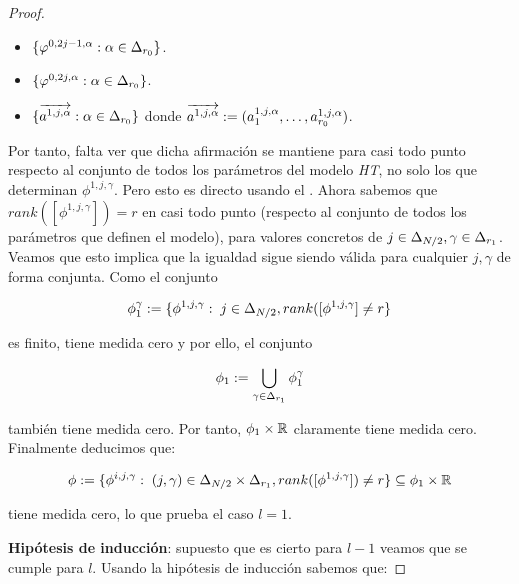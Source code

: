 \begin{proof}
    \begin{itemize}
        \item $\{ \varphi^{0, 2j - 1, \alpha}: \alpha \in \Delta_{r_0} \}$.
        \item $\{ \varphi^{0, 2j, \alpha}: \alpha \in \Delta_{r_0} \}$.
        \item $\{ \overrightarrow{a^{1, j, \alpha}} : \alpha \in \Delta_{r_0} \}$ donde $\overrightarrow{a^{1, j, \alpha}} := (a^{1, j, \alpha}_1, \ldots,  a^{1, j, \alpha}_{r_0})$.
    \end{itemize}

    Por tanto, falta ver que dicha afirmación se mantiene para casi todo punto respecto al conjunto de todos los parámetros del modelo \textit{HT}, no solo los que determinan $\phi^{1, j, \gamma}$. Pero esto es directo usando el . Ahora sabemos que $rank([\phi^{1, j, \gamma}]) = r$ en casi todo punto (respecto al conjunto de todos los parámetros que definen el modelo), para valores concretos de $j \in \Delta_{N/2}, \gamma \in \Delta_{r_1}$. Veamos que esto implica que la igualdad sigue siendo válida para cualquier $j, \gamma$ de forma conjunta. Como el conjunto

    \begin{equation}
        \phi_1^\gamma := \{ \phi^{1, j, \gamma}: \; j \in \Delta_{N/2}, rank([\phi^{1, j, \gamma}] \neq r \}
    \end{equation}

    es finito, tiene medida cero y por ello, el conjunto

    \begin{equation}
        \phi_1 := \bigcup_{\gamma \in \Delta_{r_1}} \phi_1^\gamma
    \end{equation}

    también tiene medida cero. Por tanto, $\phi_1 \times \mathbb{R}$ claramente tiene medida cero. Finalmente deducimos que:

    \begin{equation}
        \phi := \{ \phi^{i, j, \gamma}: \; (j, \gamma) \in \Delta_{N/2} \times \Delta_{r_1}, rank([\phi^{1, j, \gamma}]) \neq r \} \subseteq \phi_1 \times \mathbb{R}
    \end{equation}

    tiene medida cero, lo que prueba el caso $l = 1$.

    \textbf{Hipótesis de inducción}: supuesto que es cierto para $l - 1$ veamos que se cumple para $l$. Usando la hipótesis de inducción sabemos que:


\end{proof}
